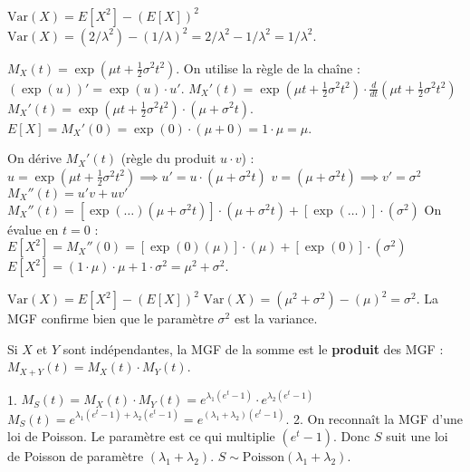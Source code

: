 \begin{correctionbox}
$\text{Var}(X) = E[X^2] - (E[X])^2$
$\text{Var}(X) = (2/\lambda^2) - (1/\lambda)^2 = 2/\lambda^2 - 1/\lambda^2 = 1/\lambda^2$.
\end{correctionbox}

\begin{correctionbox}
$M_X(t) = \exp(\mu t + \frac{1}{2}\sigma^2 t^2)$.
On utilise la règle de la chaîne : $(\exp(u))' = \exp(u) \cdot u'$.
$M_X'(t) = \exp(\mu t + \frac{1}{2}\sigma^2 t^2) \cdot \frac{d}{dt}(\mu t + \frac{1}{2}\sigma^2 t^2)$
$M_X'(t) = \exp(\mu t + \frac{1}{2}\sigma^2 t^2) \cdot (\mu + \sigma^2 t)$.
$E[X] = M_X'(0) = \exp(0) \cdot (\mu + 0) = 1 \cdot \mu = \mu$.
\end{correctionbox}

\begin{correctionbox}
On dérive $M_X'(t)$ (règle du produit $u \cdot v$) :
$u = \exp(\mu t + \frac{1}{2}\sigma^2 t^2) \implies u' = u \cdot (\mu + \sigma^2 t)$
$v = (\mu + \sigma^2 t) \implies v' = \sigma^2$
$M_X''(t) = u'v + uv'$
$M_X''(t) = [\exp(\dots)(\mu + \sigma^2 t)] \cdot (\mu + \sigma^2 t) + [\exp(\dots)] \cdot (\sigma^2)$
On évalue en $t=0$ :
$E[X^2] = M_X''(0) = [\exp(0)(\mu)] \cdot (\mu) + [\exp(0)] \cdot (\sigma^2)$
$E[X^2] = (1 \cdot \mu) \cdot \mu + 1 \cdot \sigma^2 = \mu^2 + \sigma^2$.
\end{correctionbox}

\begin{correctionbox}
$\text{Var}(X) = E[X^2] - (E[X])^2$
$\text{Var}(X) = (\mu^2 + \sigma^2) - (\mu)^2 = \sigma^2$.
La MGF confirme bien que le paramètre $\sigma^2$ est la variance.
\end{correctionbox}

\begin{correctionbox}
Si $X$ et $Y$ sont indépendantes, la MGF de la somme est le \textbf{produit} des MGF :
$M_{X+Y}(t) = M_X(t) \cdot M_Y(t)$.
\end{correctionbox}

\begin{correctionbox}
1.  $M_S(t) = M_X(t) \cdot M_Y(t) = e^{\lambda_1(e^t - 1)} \cdot e^{\lambda_2(e^t - 1)}$
    $M_S(t) = e^{\lambda_1(e^t - 1) + \lambda_2(e^t - 1)} = e^{(\lambda_1 + \lambda_2)(e^t - 1)}$.
2.  On reconnaît la MGF d'une loi de Poisson. Le paramètre est ce qui multiplie $(e^t - 1)$.
    Donc $S$ suit une loi de Poisson de paramètre $(\lambda_1 + \lambda_2)$.
    $S \sim \text{Poisson}(\lambda_1 + \lambda_2)$.
\end{correctionbox}


